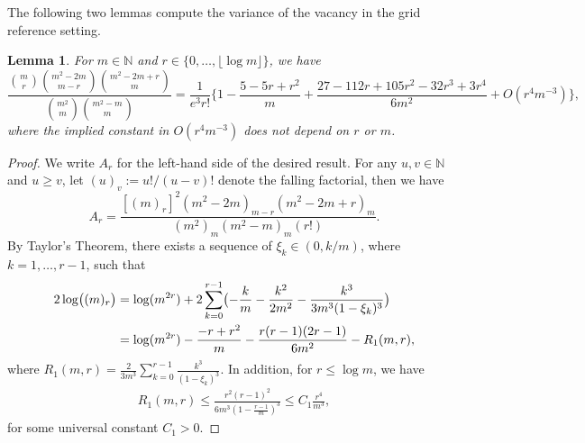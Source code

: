 \documentclass[11pt]{article}
\newtheorem{lemma}[thm]{Lemma}
\begin{document}
The following two lemmas compute the variance of the vacancy in the grid reference setting. 

\begin{lemma}
\label{Lemma:Combinatorics}
For $m\in\mathbb{N}$ and $r\in\{0,\ldots,\lfloor \log m\rfloor \}$, we have 
\[  
\frac{\binom{m}{r}\binom{m^2-2m}{m-r}\binom{m^2-2m+r}{m}}{\binom{m^2}{m}\binom{m^2-m}{m}} = \frac{1}{e^3 r!}\biggl\{1 - \frac{5-5r+r^2}{m} + \frac{27-112r+105r^2-32r^3+3r^4}{6m^2}+O(r^4m^{-3}) \biggr\},
\]
where the implied constant in $O(r^4m^{-3})$ does not depend on $r$ or $m$.
\end{lemma}
\begin{proof}
We write $A_r$ for the left-hand side of the desired result. 
    For any $u, v \in \mathbb{N}$ and $u \geq v$, let $(u)_v := u!/(u-v)!$ denote the falling factorial, then we have
\[
A_r = \frac{[(m)_r]^2 (m^2 -2m)_{m-r}(m^2 - 2m +r)_m}{(m^2)_m (m^2 - m)_m (r!)}.
\]
By Taylor's Theorem, there exists a sequence of $\xi_k \in (0, k/m)$, where $k = 1, \ldots, r-1$, such that
\begin{align}
2\log \bigl((m)_r\bigr) &= \log(m^{2r}) + 2 \sum_{k = 0}^{r-1}\bigl(-\frac{k}{m} - \frac{k^2}{2m^2} - \frac{k^3}{3m^3 (1 - \xi_k)^3}\bigr) \notag \\ 
& =  \log(m^{2r}) - \frac{-r + r^2}{m} - \frac{r(r-1)(2r-1)}{6m^2} - R_1{(m, r)},\label{eq:m_rLagrangian}
\end{align}
where $R_1{(m, r)} =  \frac{2}{3m^3}\sum_{k = 0}^{r-1}\frac{k^3}{(1-\xi_k)^3 }$. In addition, for $r \leq \log m$, we have
\begin{align}
R_1{(m, r)} \leq \frac{r^2(r-1)^2}{6m^3(1 - \frac{r-1}{m})^3} \leq C_1 \frac{r^4}{m^3},\label{eq:boundR_1}
\end{align}
for some universal constant $C_1>0$.


\end{proof}
\end{document}
